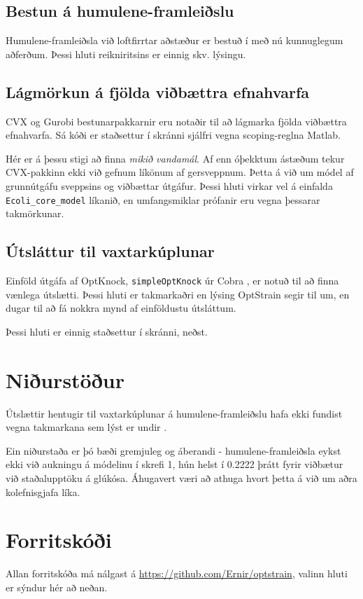 \documentclass[11pt]{article}
\begin{document}
\subsection{Bestun á humulene-framleiðslu}
Humulene-framleiðsla við loftfirrtar aðstæður er bestuð í  með nú kunnuglegum aðferðum. Þessi hluti reikniritsins er einnig skv. lýsingu.
\subsection{Lágmörkun á fjölda viðbættra efnahvarfa}
\label{sec:lagmorkun}
CVX og Gurobi bestunarpakkarnir eru notaðir til að lágmarka fjölda viðbættra efnahvarfa. Sá kóði er staðsettur í  skránni sjálfri vegna scoping-reglna Matlab.

Hér er á þessu stigi að finna \emph{mikið vandamál}. Af enn óþekktum ástæðum tekur CVX-pakkinn ekki við gefnum líkönum af gersveppnum. Þetta á við um módel af grunnútgáfu sveppsins og viðbættar útgáfur. Þessi hluti virkar vel á einfalda \texttt{Ecoli\_core\_model} líkanið, en umfangsmiklar prófanir eru vegna þessarar takmörkunar.
\subsection{Útsláttur til vaxtarkúplunar}
Einföld útgáfa af OptKnock, \texttt{simpleOptKnock} úr Cobra , er notuð til að finna vænlega útslætti. Þessi hluti er takmarkaðri en lýsing OptStrain segir til um, en dugar til að fá nokkra mynd af einföldustu útsláttum.

Þessi hluti er einnig staðsettur í  skránni, neðst.
\section{Niðurstöður}
Útslættir hentugir til vaxtarkúplunar á humulene-framleiðslu hafa ekki fundist vegna takmarkana sem lýst er undir .

Ein niðurstaða er þó bæði gremjuleg og áberandi - humulene-framleiðsla eykst ekki við aukningu á módelinu í skrefi 1, hún helst í 0.2222 þrátt fyrir viðbætur við staðalupptöku á glúkósa. Áhugavert væri að athuga hvort þetta á við um aðra kolefnisgjafa líka.
\appendix
\section{Forritskóði}
Allan forritskóða má nálgast á \url{https://github.com/Ernir/optstrain}, valinn hluti er sýndur hér að neðan.
\end{document}
